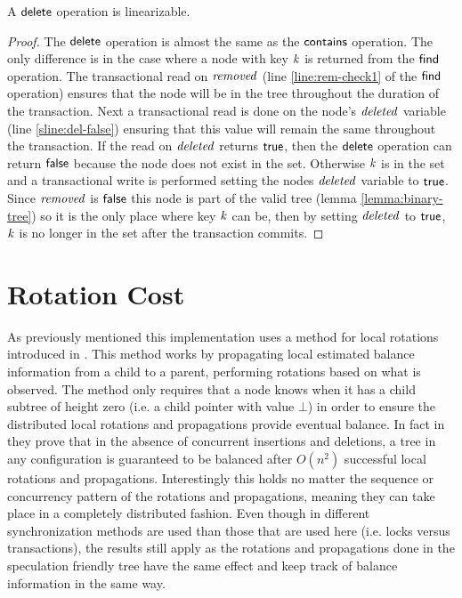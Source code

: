 \begin{theorem}
\label{theorem:delete-valid}
A $\act{delete}$ operation is linearizable.
\end{theorem}
\begin{proof}
The $\act{delete}$ operation is almost the same as the $\act{contains}$ operation.
The only difference is in the case where a node with key $\ms{k}$ is returned from the $\act{find}$ operation.
The transactional read on $\ms{removed}$ (line \ref{line:rem-check1} of the $\act{find}$ operation) ensures that the node will be in the tree throughout the duration of the transaction.
Next a transactional read is done on the node's $\ms{deleted}$ variable (line \ref{sline:del-false}) ensuring that this value will remain the same throughout the transaction.
If the read on $\ms{deleted}$ returns $\lit{true}$, then the $\act{delete}$ operation can return $\lit{false}$ because the node does not exist in the set.
Otherwise $\ms{k}$ is in the set and a transactional write is performed setting the nodes $\ms{deleted}$ variable to $\lit{true}$.
Since $\ms{removed}$ is $\lit{false}$ this node is part of the valid tree (lemma \ref{lemma:binary-tree}) so it is the only place where key $\ms{k}$ can be, then by setting
$\ms{deleted}$ to $\lit{true}$, $\ms{k}$ is no longer in the set after the transaction commits.
\end{proof}






\section{Rotation Cost}



As previously mentioned this implementation uses a method for local rotations introduced in \cite{IRISAppr}.
This method works by propagating local estimated balance information from a child to a parent,
performing rotations based on what is observed.
The method only requires that a node knows when it has a child subtree of height zero
(i.e. a child pointer with value $\bot$) in order to ensure
the distributed local rotations and propagations provide eventual balance.
In fact in \cite{IRISAppr} they prove that in the absence of concurrent insertions and deletions,
a tree in any configuration is guaranteed to be balanced after $O(n^2)$ successful local rotations
and propagations.
Interestingly this holds no matter the sequence or concurrency pattern of the rotations
and propagations, meaning they can take place in a completely distributed fashion.
Even though in \cite{IRISAppr} different synchronization methods are used than those that are used here
(i.e. locks versus transactions),
the results still apply as the rotations and
propagations done in the speculation friendly tree have the same effect and keep track of
balance information in the same way.

